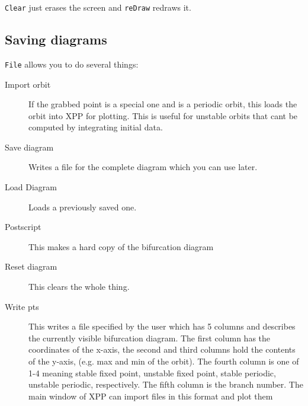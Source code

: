 \documentclass{article}
\begin{document}
{\tt Clear} just erases the screen and {\tt reDraw} redraws it.  

\subsection{Saving diagrams}
{\tt File} allows you to do several things:
\begin{description}
\item[Import orbit] If the grabbed point is a special one and is a
periodic orbit, this loads the orbit into XPP for plotting.  This is
useful for unstable orbits that cant be computed by integrating
initial data.
\item[Save diagram] Writes a file for the complete diagram which you
can use later.
\item[Load Diagram] Loads a previously saved one.
\item[Postscript]  This makes a hard copy of the bifurcation diagram
\item[Reset diagram] This clears the whole thing.
\item[Write pts] This writes a file specified by the user which has 5
columns and describes the currently visible bifurcation diagram. The
first column has the coordinates of the x-axis, the second and third
columns hold the contents of the y-axis, (e.g. max and min of the
orbit). The fourth column is one of 1-4 meaning stable fixed point,
unstable fixed point, stable periodic, unstable periodic,
respectively. The fifth column is the branch number.  The main window
of XPP can import files in this format and plot them  
\end{description}
\end{document}
